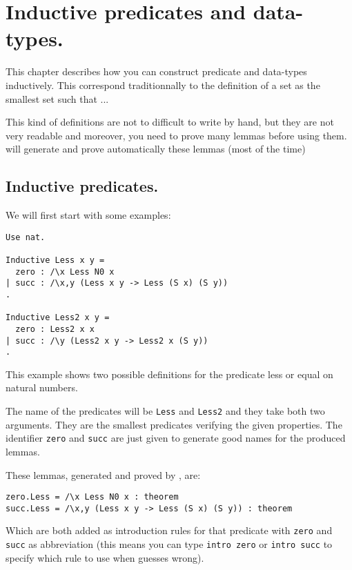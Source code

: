 
\chapter{Inductive predicates and data-types.}

This chapter describes how you can construct predicate and data-types
inductively. This correspond traditionnally to the definition of a set
as the smallest set such that ...

This kind of definitions are not to difficult to write by hand, but they are
not very readable and moreover, you need to prove many lemmas before
using them. \AFD  will generate and prove automatically these lemmas
(most of the time)

\section{Inductive predicates.}

We will first start with some examples:

\begin{verbatim}
Use nat.

Inductive Less x y =
  zero : /\x Less N0 x
| succ : /\x,y (Less x y -> Less (S x) (S y))
. 

Inductive Less2 x y =
  zero : Less2 x x
| succ : /\y (Less2 x y -> Less2 x (S y))
. 
\end{verbatim}

This example shows two possible definitions for 
the predicate less or equal on natural numbers.

The name of the predicates will be \verb#Less# and \verb#Less2# and
they take both two arguments. They are the smallest predicates verifying
the given properties. The identifier \verb#zero# and \verb#succ# are
just given to generate good names for the produced lemmas.

These lemmas, generated and proved by \AFD , are:

\begin{verbatim}
zero.Less = /\x Less N0 x : theorem
succ.Less = /\x,y (Less x y -> Less (S x) (S y)) : theorem
\end{verbatim}

Which are both added as introduction rules for that predicate with
\verb#zero# and \verb#succ# as abbreviation (this means you can type
\verb#intro zero# or \verb#intro succ# to specify which rule to use
when \AFD  guesses wrong).

